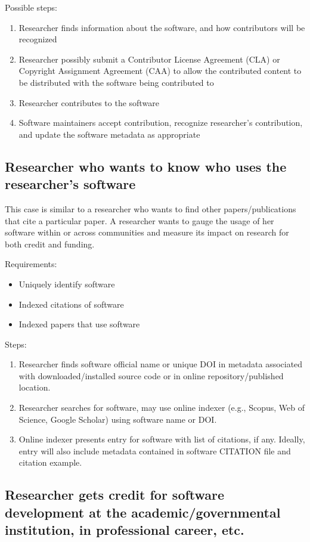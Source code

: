\documentclass[12pt, oneside]{amsart}
\begin{document}
Possible steps:
\begin{enumerate}
\item Researcher finds information about the software, and how contributors will be recognized
\item Researcher possibly submit a Contributor License Agreement (CLA) or Copyright Assignment Agreement (CAA) to allow the contributed content to be distributed with the software being contributed to
\item Researcher contributes to the software
\item Software maintainers accept contribution, recognize researcher's contribution, and update the software metadata as appropriate
\end{enumerate}

\subsection{Researcher who wants to know who uses the researcher's software}

This case is similar to a researcher who wants to find other papers/publications that cite a particular paper.
A researcher wants to gauge the usage of her software within or across communities and measure its impact on research for both credit and funding.

Requirements:
\begin{itemize}
\item Uniquely identify software
\item Indexed citations of software
\item Indexed papers that use software
\end{itemize}

Steps:
\begin{enumerate}
\item Researcher finds software official name or unique DOI in metadata associated with downloaded/installed source code or in online repository/published location.
\item Researcher searches for software, may use online indexer (e.g., Scopus, Web of Science, Google Scholar) using software name or DOI.
\item Online indexer presents entry for software with list of citations, if any.
Ideally, entry will also include metadata contained in software CITATION file and citation example.
\end{enumerate}

\subsection{Researcher gets credit for software development at the academic\slash governmental institution, in professional career, etc.}
\end{document}
